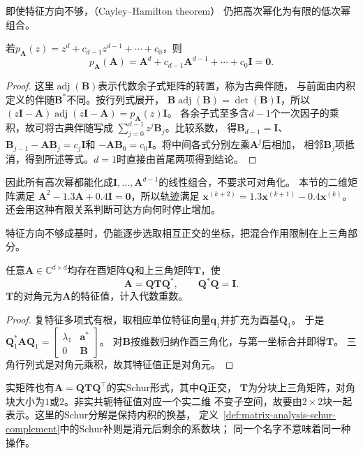 即使特征方向不够，（Cayley--Hamilton theorem）
仍把高次幂化为有限的低次幂组合。
\begin{theorem}
若$p_{\bm A}(z)=z^d+c_{d-1}z^{d-1}+\cdots+c_0$，则
\[
 p_{\bm A}(\bm A)
 =\bm A^d+c_{d-1}\bm A^{d-1}+\cdots+c_0\bm I=\bm0.
\]
\end{theorem}
\begin{proof}
这里$\operatorname{adj}(\bm B)$表示代数余子式矩阵的转置，称为古典伴随，
与前面由内积定义的伴随$\bm B^*$不同。按行列式展开，
$\bm B\operatorname{adj}(\bm B)=\det(\bm B)\bm I$，所以
$(z\bm I-\bm A)\operatorname{adj}(z\bm I-\bm A)=p_{\bm A}(z)\bm I$。
各余子式至多含$d-1$个一次因子的乘积，故可将古典伴随写成
$\sum_{j=0}^{d-1}z^j\bm B_j$。比较系数，
得$\bm B_{d-1}=\bm I$、
$\bm B_{j-1}-\bm A\bm B_j=c_j\bm I$和
$-\bm A\bm B_0=c_0\bm I$。将中间各式分别左乘$\bm A^j$后相加，
相邻$\bm B_j$项抵消，得到所述等式。$d=1$时直接由首尾两项得到结论。
\end{proof}
因此所有高次幂都能化成$\bm I,\ldots,\bm A^{d-1}$的线性组合，不要求可对角化。
本节的二维矩阵满足
$\bm A^2-1.3\bm A+0.4\bm I=\bm0$，所以轨迹满足
$\bm x^{(k+2)}=1.3\bm x^{(k+1)}-0.4\bm x^{(k)}$。
还会用这种有限关系判断可达方向何时停止增加。


特征方向不够成基时，仍能逐步选取相互正交的坐标，把混合作用限制在上三角部分。
\begin{theorem}[复Schur分解]
任意$\bm A\in\mathbb C^{d\times d}$均存在酉矩阵$\bm Q$和上三角矩阵$\bm T$，使
\begin{equation}
 \bm A=\bm Q\bm T\bm Q^*,\qquad \bm Q^*\bm Q=\bm I.
 \label{eq:matrix-analysis-schur-decomposition}
\end{equation}
$\bm T$的对角元为$\bm A$的特征值，计入代数重数。
\end{theorem}
\begin{proof}
复特征多项式有根，取相应单位特征向量$\bm q_1$并扩充为酉基$\bm Q_1$。
于是$\bm Q_1^*\bm A\bm Q_1=
\left[\begin{smallmatrix}\lambda_1&\bm a^*\\0&\bm B\end{smallmatrix}\right]$。
对$\bm B$按维数归纳作酉三角化，与第一坐标合并即得$\bm T$。
三角行列式是对角元乘积，故其特征值正是对角元。
\end{proof}

实矩阵也有$\bm A=\bm Q\bm T\bm Q^\top$的实Schur形式，其中$\bm Q$正交，
$\bm T$为分块上三角矩阵，对角块大小为$1$或$2$。非实共轭特征值对应一个实二维
不变子空间，故要由$2\times2$块一起表示。这里的Schur分解是保持内积的换基，
定义~\ref{def:matrix-analysis-schur-complement}中的Schur补则是消元后剩余的系数块；
同一个名字不意味着同一种操作。

